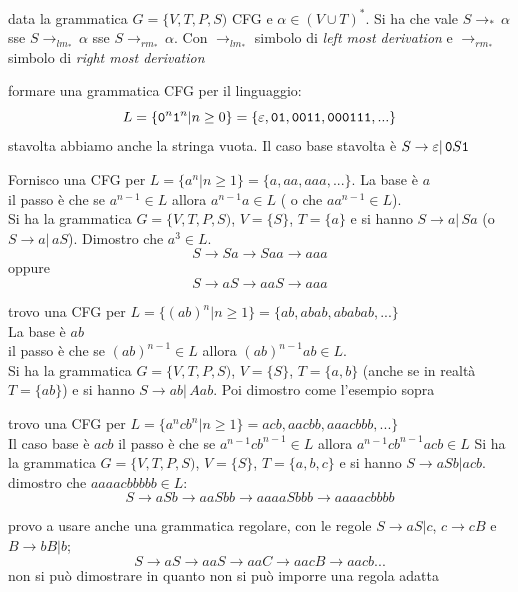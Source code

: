 \begin{theorem}
	data la grammatica $G=\{V,T,P,S)$ CFG e $\alpha\in (V\cup T)^*$. Si ha che vale $S\to_*\, \alpha$ sse $S\to_{lm_*}\, \alpha$ sse $S\to_{rm_*}\, \alpha$. Con $\to_{lm_*}$ simbolo di \textit{left most derivation }e $\to_{rm_*}$ simbolo di \textit{right most derivation}
\end{theorem}
\begin{example}
	formare una grammatica CFG per il linguaggio:
	$$L=\{\mathtt{0}^n \mathtt{1}^n| n\geq 0\}=\{\varepsilon, \mathtt{0}\mathtt{1}, \mathtt{0}\mathtt{0}\mathtt{1}\mathtt{1}, \mathtt{0}\mathtt{0}\mathtt{0}\mathtt{1}\mathtt{1}\mathtt{1},...\}$$
	stavolta abbiamo anche la stringa vuota. Il caso base stavolta è $S\to\varepsilon| \, \mathtt{0} S\mathtt{1}$
\end{example}
\begin{example}
	Fornisco una CFG per $L=\{a^n|n\geq 1\}=\{a, aa, aaa,...\}$.
	La base è $a$ \\il passo è che se $a^{n-1}\in L$ allora $a^{n-1}a\in L$ ( o che $aa^{n-1}\in L$).\\
	Si ha la grammatica $G=\{V,T,P,S)$, $V=\{S\}$, $T=\{a\}$ e si hanno $S\to a|\,Sa$ (o  $S\to a|\,aS$). Dimostro che $a^3\in L$.
	$$S\to Sa \to Saa\to aaa$$
	oppure
	$$S\to aS\to aaS\to aaa$$
\end{example}
\begin{example}
	trovo una CFG per $L=\{(ab)^n|n\geq 1\}=\{ab, abab, ababab,...\}$\\
	La base è $ab$ \\il passo è che se $(ab)^{n-1}\in L$ allora $(ab)^{n-1}ab\in L$.\\
	Si ha la grammatica $G=\{V,T,P,S)$, $V=\{S\}$, $T=\{a,b\}$ (anche se in realtà $T=\{ab\}$) e si hanno $S\to ab|\,Aab$. Poi dimostro come l'esempio sopra
\end{example}
\begin{example}
	trovo una CFG per $L=\{a^n c b^n|n\geq 1\}=acb,aacbb,aaacbbb,...\}$\\
	Il caso base è $acb$ il passo è che se $a^{n-1}cb^{n-1}\in L$ allora $a^{n-1}cb^{n-1}acb\in L$
	Si ha la grammatica $G=\{V,T,P,S)$, $V=\{S\}$, $T=\{a,b,c\}$ e si hanno $S\to aSb|acb$.\\
	dimostro che $aaaacbbbbb\in L$:
	$$S\to aSb\to aaSbb\to aaaaSbbb\to aaaacbbbb$$

	provo a usare anche una grammatica regolare, con le regole $S\to aS|c$, $c\to cB$ e $B\to bB|b$;
	$$S\to aS\to aaS\to aaC\to aacB\to aacb...$$
	non si può dimostrare in quanto non si può imporre una regola adatta
\end{example}
